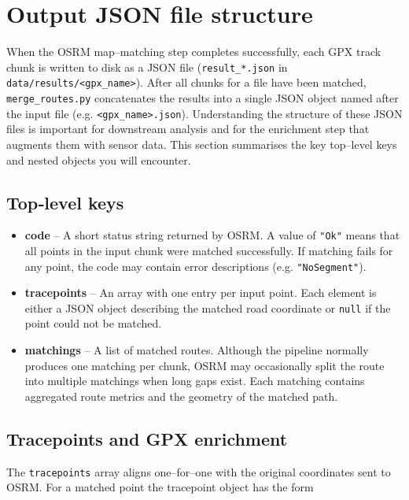 \documentclass[11pt,a4paper]{article}
\begin{document}
\section{Output JSON file structure}
When the OSRM map–matching step completes successfully, each GPX track chunk is written to disk as a JSON file (\verb|result_*.json| in \texttt{data/results/\textless{}gpx\_name\textgreater{}}).  After all chunks for a file have been matched, \texttt{merge\_routes.py} concatenates the results into a single JSON object named after the input file (e.g. \texttt{\textless{}gpx\_name\textgreater{}.json}).  Understanding the structure of these JSON files is important for downstream analysis and for the enrichment step that augments them with sensor data.  This section summarises the key top–level keys and nested objects you will encounter.

\subsection{Top‑level keys}
\begin{itemize}
	\item \textbf{code} – A short status string returned by OSRM.  A value of \texttt{"Ok"} means that all points in the input chunk were matched successfully.  If matching fails for any point, the code may contain error descriptions (e.g. \texttt{"NoSegment"}).
	\item \textbf{tracepoints} – An array with one entry per input point.  Each element is either a JSON object describing the matched road coordinate or \texttt{null} if the point could not be matched.
	\item \textbf{matchings} – A list of matched routes.  Although the pipeline normally produces one matching per chunk, OSRM may occasionally split the route into multiple matchings when long gaps exist.  Each matching contains aggregated route metrics and the geometry of the matched path.
\end{itemize}

\subsection{Tracepoints and GPX enrichment}
The \texttt{tracepoints} array aligns one–for–one with the original coordinates sent to OSRM.  For a matched point the tracepoint object has the form
\end{document}
